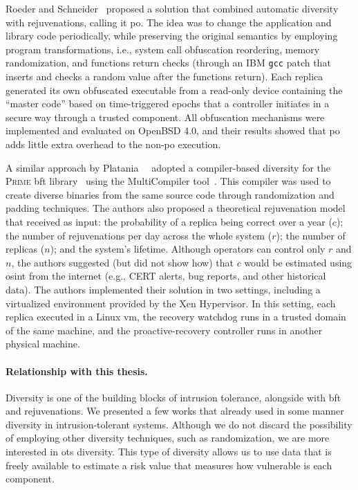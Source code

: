 Roeder and Schneider~\cite{Roeder:2010} proposed a solution that combined automatic diversity with rejuvenations, calling it \gls{po}.
The idea was to change the application and library code periodically, while preserving the original semantics by employing program transformations, i.e., system call obfuscation reordering, memory randomization, and functions return checks (through an IBM \texttt{gcc} patch that inserts and checks a random value after the functions return).
Each replica generated its own obfuscated executable from a read-only device containing the ``master code'' based on time-triggered epochs that a controller initiates in a secure way through a trusted component.
All obfuscation mechanisms were implemented and evaluated on OpenBSD 4.0, and their results showed that \gls{po} adds little extra overhead to the non-\gls{po} execution.

A similar approach by Platania~\etal{}~\cite{Platania:2014} adopted a compiler-based diversity for the \textsc{Prime} \gls{bft} library~\cite{Amir:2011} using the MultiCompiler tool~\cite{Homescu:2013}.
This compiler was used to create diverse binaries from the same source code through randomization and padding techniques.
The authors also proposed a theoretical rejuvenation model that received as input: the probability of a replica being correct over a year ($c$); the number of rejuvenations per day across the whole system ($r$); the number of replicas ($n$); and the system's lifetime. 
Although operators can control only $r$ and $n$, the authors suggested (but did not show how) that $c$ would be estimated using \gls{osint} from the internet (e.g., CERT alerts, bug reports, and other historical data).
The authors implemented their solution in two settings, including a virtualized environment provided by the Xen Hypervisor.
In this setting, each replica executed in a Linux \gls{vm}, the recovery watchdog runs in a trusted domain of the same machine, and the proactive-recovery controller runs in another physical machine.


\paragraph{Relationship with this thesis.} 
Diversity is one of the building blocks of intrusion tolerance, alongside with \gls{bft} and rejuvenations. 
We presented a few works that already used in some manner diversity in intrusion-tolerant systems. 
Although we do not discard the possibility of employing other diversity techniques, such as randomization, we are more interested in \gls{ots} diversity.
This type of diversity allows us to use data that is freely available to estimate a risk value that measures how vulnerable is each component. 

